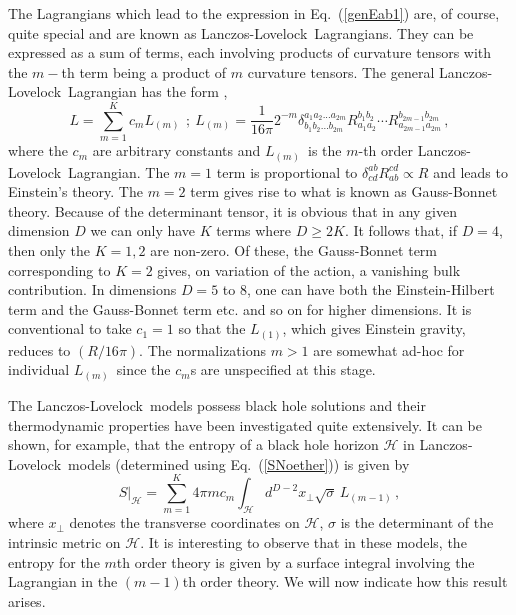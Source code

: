 \documentclass[12pt]{iopart}
\def\eq#1{{Eq.~(\ref{#1})}}
\newcommand{\LL}{Lanczos-Lovelock}
\newcommand{\Cal}[1]{\ensuremath{\mathcal{#1}}}
\newcommand{\Alt}[6]{\ensuremath{\delta^{#1 #2 ... #3}_{#4 #5
      ... #6}}}
\newcommand{\Riem}[4]{\ensuremath{R^{#1 #2}_{#3 #4}}}
\newcommand{\LDm}{\ensuremath{L_{(m)}}}
\newcommand{\sD}[1]{\sum_{m=1}^{K}{#1}}
\begin{document}
 
 The Lagrangians which lead to the expression in \eq{genEab1}
are, of course, quite special and are known as \LL\ Lagrangians. They can be expressed as a sum of terms, each involving products of  curvature tensors with the $m-$th term being a product of $m$ curvature tensors. The  
general \LL\ Lagrangian has the form \cite{lovelock},
\begin{equation}
{L} = \sD{c_m\LDm}\,~;~{L}_{(m)} = \frac{1}{16\pi}
2^{-m} \Alt{a_1}{a_2}{a_{2m}}{b_1}{b_2}{b_{2m}}
\Riem{b_1}{b_2}{a_1}{a_2} \cdots \Riem{b_{2m-1}}{b_{2m}}{a_{2m-1}}{a_{2m}}
\,,  
\label{twotw}
\end{equation}
where the $c_m$ are arbitrary constants and \LDm\ is the $m$-th
order \LL\ Lagrangian.
The $m=1$ term is proportional to $\delta^{ab}_{cd}R^{cd}_{ab} \propto R$ and leads
to Einstein's theory. The $m=2$ term gives rise to what is known as Gauss-Bonnet theory.
Because of the determinant tensor, it is obvious that in any given dimension $D$ we can only have $K$ terms where 
$D\geq 2K$.
It follows that, if $D=4$, then only the $K=1, 2$ are non-zero.
Of these, the Gauss-Bonnet term corresponding to $K=2$ gives, on variation of the
action, a vanishing bulk contribution.
In dimensions $D=5$ to $8$, one can have both the Einstein-Hilbert term
and the Gauss-Bonnet term etc. and so on for higher dimensions.
 It is conventional to take $c_1 =1$ so that
the ${\ensuremath{{L}_{(1)}}}$, which gives Einstein gravity, reduces to $(R/16\pi)$.
The normalizations $m>1$ are somewhat ad-hoc for individual \LDm\ since the $c_m$s 
are unspecified at this stage.

The \LL\ models possess black hole solutions and their thermodynamic properties have been investigated quite extensively. It can be shown, for example, that the entropy of a black hole horizon $\mathcal{H}$ in \LL\ models (determined using \eq{SNoether}) is given by
\begin{equation}
S|_{\Cal{H}} = \sD{4\pi m c_m \int_{\Cal{H}}{d^{D-2}x_{\perp} 
  \sqrt{\sigma}\,L_{(m-1)}}} 
  \,,      
\label{ent-limit-2}
\end{equation} 
where $x_{\perp}$ denotes the transverse coordinates on \Cal{H},
$\sigma$ is the determinant of the intrinsic metric on \Cal{H}.  It is interesting to observe that in these models, the entropy for the $m$th order theory is given by a surface integral involving the Lagrangian in the $(m-1)$th order theory. We will now indicate how this result arises.
\end{document}
